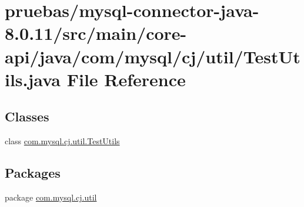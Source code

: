 \hypertarget{main_2core-api_2java_2com_2mysql_2cj_2util_2_test_utils_8java}{}\section{pruebas/mysql-\/connector-\/java-\/8.0.11/src/main/core-\/api/java/com/mysql/cj/util/\+Test\+Utils.java File Reference}
\label{main_2core-api_2java_2com_2mysql_2cj_2util_2_test_utils_8java}
\subsection*{Classes}
\begin{DoxyCompactItemize}
\item 
class \mbox{\hyperlink{classcom_1_1mysql_1_1cj_1_1util_1_1_test_utils}{com.\+mysql.\+cj.\+util.\+Test\+Utils}}
\end{DoxyCompactItemize}
\subsection*{Packages}
\begin{DoxyCompactItemize}
\item 
package \mbox{\hyperlink{namespacecom_1_1mysql_1_1cj_1_1util}{com.\+mysql.\+cj.\+util}}
\end{DoxyCompactItemize}
